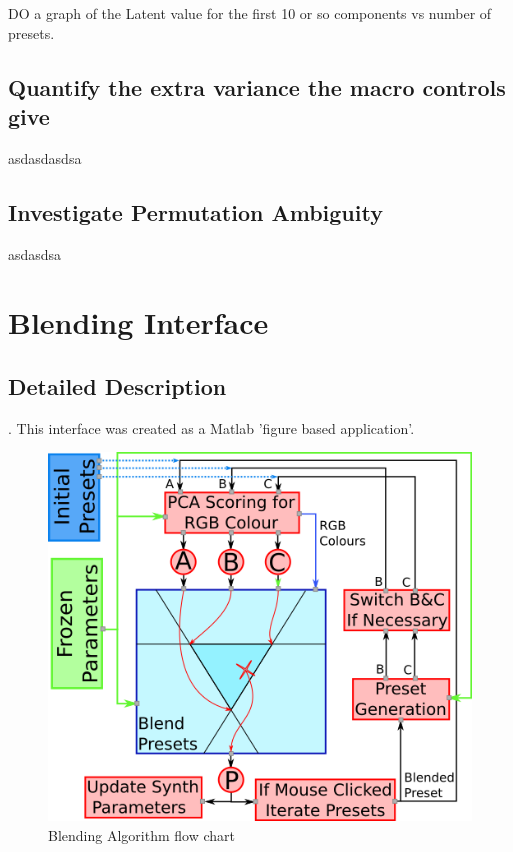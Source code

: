 \documentclass[11pt, oneside]{report}   	%
\begin{document}
DO a graph of the Latent value for the first 10 or so components vs number of presets.

\subsection{Quantify the extra variance the macro controls give}
asdasdasdsa
\subsection{Investigate Permutation Ambiguity}
asdasdsa

\section{Blending Interface}
\subsection{Detailed Description}\label{sec:BlendingDesription}.
This interface was created as a Matlab 'figure based application'.

\begin{figure}[h] 
	\centering
	\includegraphics[width = \textwidth]{BlendingAlgorithm.png}
	\caption{Blending Algorithm flow chart}
	\label{fig:BlendingAlgorithm}
\end{figure}
\end{document}
